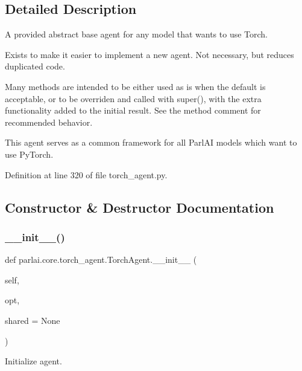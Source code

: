 \subsection{Detailed Description}
\begin{DoxyVerb}A provided abstract base agent for any model that wants to use Torch.

Exists to make it easier to implement a new agent.
Not necessary, but reduces duplicated code.

Many methods are intended to be either used as is when the default is
acceptable, or to be overriden and called with super(), with the extra
functionality added to the initial result. See the method comment for
recommended behavior.

This agent serves as a common framework for all ParlAI models which want
to use PyTorch.
\end{DoxyVerb}
 

Definition at line 320 of file torch\+\_\+agent.\+py.



\subsection{Constructor \& Destructor Documentation}
\mbox{\label{classparlai_1_1core_1_1torch__agent_1_1TorchAgent_ad0a00ada1fcd5b7ceec27b1a6cbdc281}} 
\subsubsection{\texorpdfstring{\+\_\+\+\_\+init\+\_\+\+\_\+()}{\_\_init\_\_()}}
{\footnotesize\ttfamily def parlai.\+core.\+torch\+\_\+agent.\+Torch\+Agent.\+\_\+\+\_\+init\+\_\+\+\_\+ (\begin{DoxyParamCaption}\item[{}]{self,  }\item[{}]{opt,  }\item[{}]{shared = {\ttfamily None} }\end{DoxyParamCaption})}

\begin{DoxyVerb}Initialize agent.\end{DoxyVerb}
 

